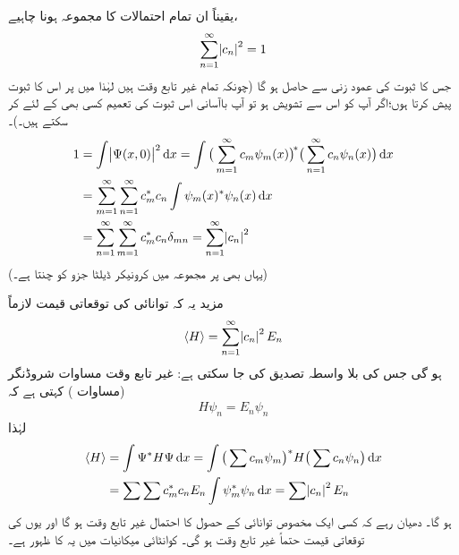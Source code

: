 یقیناً ان تمام احتمالات کا مجموعہ  ہونا چاہیے،
\begin{align}
\sum_{n=1}^{\infty}\abs{c_n}^2=1
\end{align}
جس کا ثبوت  کی عمود زنی سے حاصل ہو گا (چونکہ تمام  غیر تابع وقت ہیں لہٰذا میں  پر اس کا ثبوت پیش کرتا ہوں؛اگر آپ کو اس سے تشویش ہو تو آپ باآسانی اس ثبوت کی تعمیم کسی بھی  کے لئے کر سکتے ہیں۔)۔
\begin{align*}
1&=\int\abs{\Psi(x,0)}^2\dif x=\int \big(\sum_{m=1}^{\infty}c_m\psi_m(x)\big)^{\!*}\big(\sum_{n=1}^{\infty}c_n\psi_n(x)\big)\dif x\\
&=\sum_{m=1}^{\infty}\sum_{n=1}^{\infty}c_m^*c_n\int\psi_m(x)^*\psi_n(x)\dif x\\
&=\sum_{n=1}^{\infty}\sum_{m=1}^{\infty}c_m^*c_n\delta_{mn}=\sum_{n=1}^{\infty}\abs{c_n}^2
\end{align*}
(یہاں بھی  پر مجموعہ میں کرونیکر ڈیلٹا جزو  کو چنتا ہے۔)

مزید یہ کہ توانائی کی توقعاتی قیمت لازماً 
\begin{align}\label{مساوات_غیر_تابع_وقت_توانائی_توقعاتی_قیمت}
\langle H\rangle=\sum_{n=1}^{\infty} \abs{c_n}^2 E_n
\end{align} 
ہو گی جس کی بلا واسطہ تصدیق کی جا سکتی ہے: غیر تابع وقت مساوات شروڈنگر (مساوات ) کہتی ہے کہ
\begin{align}
H\psi_n=E_n\psi_n
\end{align}
لہٰذا
\begin{align*}
\langle H \rangle &=\int \Psi^*H\Psi\dif x=\int \big(\sum c_m\psi_m\big)^* H\big(\sum c_n\psi_n\big)\dif x\\
&=\sum\sum c_m^*c_nE_n\int \psi_m^*\psi_n\dif x=\sum\abs{c_n}^2 E_n
\end{align*}
ہو گا۔ دھیان رہے کہ کسی ایک مخصوص توانائی کے حصول کا احتمال غیر تابع وقت ہو گا اور یوں  کی توقعاتی قیمت حتماً غیر تابع وقت ہو گی۔ کوانٹائی میکانیات میں یہ  کا ظہور ہے۔

